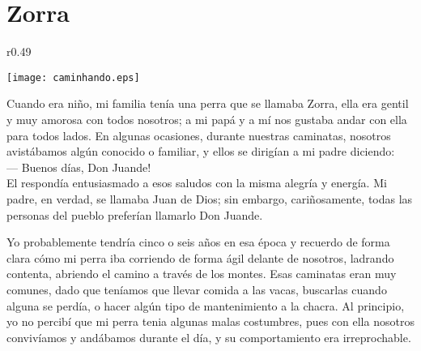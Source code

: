 \cleardoublepage
\newpage
\ifdefined\EnableIncludeImages
\fi
\chapter{Zorra}


\ifdefined\EnableIncludeImages
\begin{wrapfigure}{r}{0.49\textwidth}
  \begin{center}
  \vspace{-30pt}
    \texttt{[image: caminhando.eps]}
  \end{center}
  \vspace{-20pt}
\end{wrapfigure}
\fi
Cuando era niño, mi familia tenía una perra que se llamaba Zorra, ella era gentil y muy amorosa con todos nosotros; a mi papá y a mí nos gustaba andar con ella para todos lados. En algunas ocasiones, durante nuestras caminatas, nosotros avistábamos algún conocido o familiar, y ellos se dirigían a mi padre diciendo:\\\indent
--- Buenos días, Don Juande!\\\indent
El respondía entusiasmado a esos saludos con la misma alegría y energía.
Mi padre, en verdad, se llamaba Juan de Dios; sin embargo, cariñosamente, todas las personas del pueblo preferían llamarlo Don Juande.

Yo probablemente tendría cinco o seis años en esa época y recuerdo de forma clara cómo mi perra iba corriendo de forma ágil delante de nosotros, ladrando contenta, abriendo el camino a través de los montes.
Esas caminatas eran muy comunes, dado que teníamos que llevar comida a las vacas, buscarlas cuando alguna se perdía, o hacer algún tipo de mantenimiento a la chacra.
Al principio, yo no percibí que mi perra tenia algunas malas costumbres, pues con ella nosotros convivíamos y andábamos durante el día, y su comportamiento era irreprochable.

